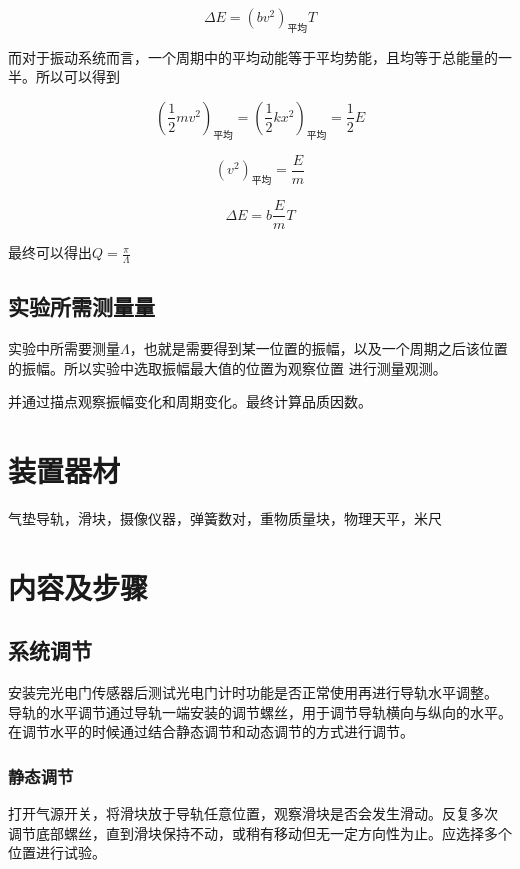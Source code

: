 \documentclass{ctexart}
\begin{document}
    $$\Delta E = (bv^{2})_{\mbox{平均}}T$$

    而对于振动系统而言，一个周期中的平均动能等于平均势能，且均等于总能量的一半。所以可以得到

    \begin{equation}
      (\frac{1}{2}mv^{2})_{\mbox{平均}} = (\frac{1}{2}kx^{2})_{\mbox{平均}} = \frac{1}{2} E
    \end{equation}

    \begin{equation}
      (v^{2})_{\mbox{平均}} = \frac{E}{m}
    \end{equation}

    \begin{equation}
      \Delta E = b \frac{E}{m} T
    \end{equation}
    
    最终可以得出$Q = \frac{\pi}{\Lambda}$

  \subsection{实验所需测量量}
  实验中所需要测量$\Lambda$，也就是需要得到某一位置的振幅，以及一个周期之后该位置的振幅。所以实验中选取振幅最大值的位置为观察位置
  进行测量观测。

  并通过描点观察振幅变化和周期变化。最终计算品质因数。


\section{装置器材}
气垫导轨，滑块，摄像仪器，弹簧数对，重物质量块，物理天平，米尺

\section{内容及步骤}
  \subsection{系统调节}
  安装完光电门传感器后测试光电门计时功能是否正常使用再进行导轨水平调整。
  导轨的水平调节通过导轨一端安装的调节螺丝，用于调节导轨横向与纵向的水平。
  在调节水平的时候通过结合静态调节和动态调节的方式进行调节。
    \subsubsection{静态调节}
    打开气源开关，将滑块放于导轨任意位置，观察滑块是否会发生滑动。反复多次
    调节底部螺丝，直到滑块保持不动，或稍有移动但无一定方向性为止。应选择多个
    位置进行试验。
\end{document}
